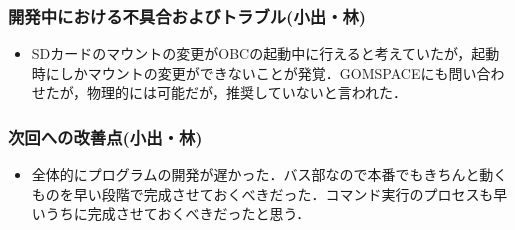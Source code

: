 \subsubsection{開発中における不具合およびトラブル(小出・林)}
\begin{itemize}
	\item SDカードのマウントの変更がOBCの起動中に行えると考えていたが，起動時にしかマウントの変更ができないことが発覚．GOMSPACEにも問い合わせたが，物理的には可能だが，推奨していないと言われた．
\end{itemize}
\subsubsection{次回への改善点(小出・林)}
\begin{itemize}
	\item 全体的にプログラムの開発が遅かった．バス部なので本番でもきちんと動くものを早い段階で完成させておくべきだった．コマンド実行のプロセスも早いうちに完成させておくべきだったと思う．
\end{itemize}
